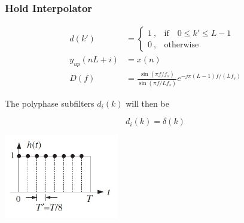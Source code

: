\subsubsection{Hold Interpolator}
\begin{multicols}{2}
	\begin{align*}
		d(k') &= \begin{cases}
			1\:, & \text{if} \quad 0\leq k' \leq L -1\\
			0\:, & \text{otherwise}
		\end{cases} \\
		y_{up}(nL+i) &= x(n) \\
		D(f) &= \frac{\sin(\pi f/f_s)}{\sin(\pi f/Lf_s)}e^{-j\pi(L-1)f/(Lf_s)}
	\end{align*}

	The polyphase subfilters $d_i(k)$ will then be

	\begin{equation*}
		d_i(k) = \delta(k)
	\end{equation*}

\vfill
\columnbreak
	\begin{center}
		\includegraphics[width=5cm]{images/IntDecOv_Hold.jpg}
	\end{center}
\vfill
\end{multicols}

